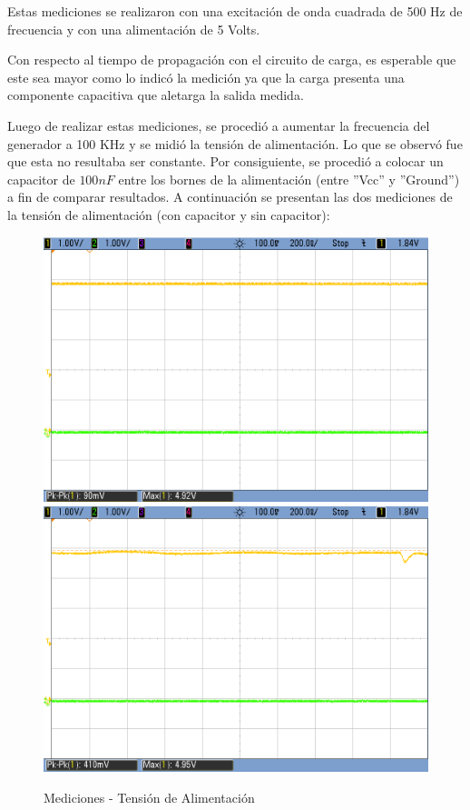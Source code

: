 Estas mediciones se realizaron con una excitación de onda cuadrada
de 500 Hz de frecuencia y con una alimentación de 5 Volts.

Con respecto al tiempo de propagación con el circuito de carga, es
esperable que este sea mayor como lo indicó la medición ya que la
carga presenta una componente capacitiva que aletarga la salida medida.

Luego de realizar estas mediciones, se procedió a aumentar la frecuencia
del generador a 100 KHz y se midió la tensión de alimentación. Lo que
se observó fue que esta no resultaba ser constante. Por consiguiente,
se procedió a colocar un capacitor de $100nF$ entre los bornes de
la alimentación (entre ''Vcc'' y ''Ground'') a fin de comparar
resultados. A continuación se presentan las dos mediciones de la tensión
de alimentación (con capacitor y sin capacitor):

\begin{figure}[H]
    \centering
\includegraphics[scale=0.3]{AlimentacionConDesacople}
\qquad
\includegraphics[scale=0.3]{AlimentacionSinDesacople}
\caption{Mediciones - Tensión de Alimentación}
\end{figure}


